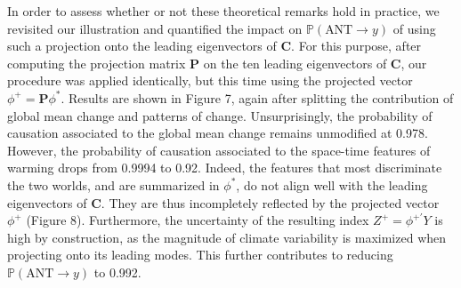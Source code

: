 \documentclass[12pt]{article}
\newcommand{\PNS}{\textrm{PNS}}
\newcommand{\Proba}{\mathbb P}
\begin{document}
In order to assess whether or not these theoretical remarks hold in practice, we revisited our illustration and quantified the impact on $\Proba(\textrm{ANT}\rightarrow y)$ of using such a projection onto the leading eigenvectors of $\mathbf C$. For this purpose, after computing the projection matrix $\mathbf P$ on the ten leading eigenvectors of $\mathbf C$, our procedure was applied identically, but this time using the projected vector $\phi^+ = \mathbf P\phi^*$. Results are shown in Figure 7, again after splitting the contribution of global mean change and patterns of change. Unsurprisingly, the probability of causation associated to the global mean change remains unmodified at 0.978. However, the probability of causation associated to the space-time features of warming drops from 0.9994 to 0.92. %
Indeed, the features that most discriminate the two worlds, and are summarized in $\phi^*$, do not align well with the leading eigenvectors of $\mathbf C$. They are thus incompletely reflected by the projected vector $\phi^+$ (Figure 8). Furthermore, the uncertainty of the resulting index $Z^+=\phi^{+'}Y$ is high by construction, as the magnitude of climate variability is maximized when projecting onto its leading modes. This further contributes to reducing $\Proba(\textrm{ANT}\rightarrow y)$ to 0.992. 



\end{document}
